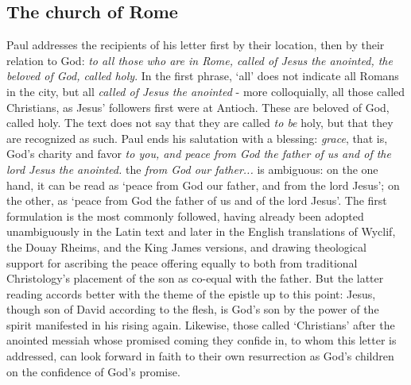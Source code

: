 \subsection{The church of Rome}
Paul addresses the recipients of his letter first by their location, then by their relation to God: \emph{to all those who are in Rome, called of Jesus the anointed, the beloved of God, called holy}. In the first phrase, `all' does not indicate all Romans in the city, but all \emph{called of Jesus the anointed} - more colloquially, all those called Christians, as Jesus' followers first were at Antioch. These are beloved of God, called holy. The text does not say that they are called \emph{to be} holy, but that they are recognized as such. Paul ends his salutation with a blessing: \emph{grace}, that is, God's charity and favor \emph{to you, and peace from God the father of us and of the lord Jesus the anointed.} the \emph{from God our father...} is ambiguous: on the one hand, it can be read as `peace from God our father, and from the lord Jesus'; on the other, as `peace from God the father of us and of the lord Jesus'. The first formulation is the most commonly followed, having already been adopted unambiguously in the Latin text and later in the English translations of Wyclif, the Douay Rheims, and the King James versions, and drawing theological support for ascribing the peace offering equally to both from traditional Christology's placement of the son as co-equal with the father. But the latter reading accords better with the theme of the epistle up to this point: Jesus, though son of David according to the flesh, is God's son by the power of the spirit manifested in his rising again. Likewise, those called `Christians' after the anointed messiah whose promised coming they confide in, to whom this letter is addressed, can look forward in faith to their own resurrection as God's children on the confidence of God's promise.